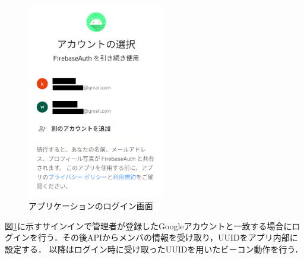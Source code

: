 \begin{figure}[tbh]
  \centering
  \includegraphics[width=6cm]{image/AppSignIn.png}
  \caption{アプリケーションのログイン画面}
  \label{fig:AppSignIn}
\end{figure}


図\ref{fig:AppSignIn}に示すサインインで管理者が登録したGoogleアカウントと一致する場合にログインを行う．その後APIからメンバの情報を受け取り，UUIDをアプリ内部に設定する．
以降はログイン時に受け取ったUUIDを用いたビーコン動作を行う．


